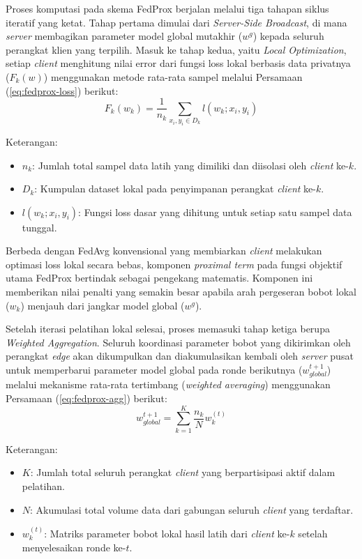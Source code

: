 Proses komputasi pada skema FedProx berjalan melalui tiga tahapan siklus iteratif yang ketat. Tahap pertama dimulai dari \textit{Server-Side Broadcast}, di mana \textit{server} membagikan parameter model global mutakhir ($w^g$) kepada seluruh perangkat klien yang terpilih. Masuk ke tahap kedua, yaitu \textit{Local Optimization}, setiap \textit{client} menghitung nilai error dari fungsi loss lokal berbasis data privatnya ($F_k(w)$) menggunakan metode rata-rata sampel melalui Persamaan (\ref{eq:fedprox-loss}) berikut:
\begin{equation}
  \label{eq:fedprox-loss}
  F_k(w_k) = \frac{1}{n_k} \sum_{x_i, y_i \in D_k} l(w_k; x_i, y_i)
\end{equation}

Keterangan:
\begin{itemize}[itemsep=1pt]
  \item $n_k$: Jumlah total sampel data latih yang dimiliki dan diisolasi oleh \textit{client} ke-$k$.
  \item $D_k$: Kumpulan dataset lokal pada penyimpanan perangkat \textit{client} ke-$k$.
  \item $l(w_k; x_i, y_i)$: Fungsi loss dasar yang dihitung untuk setiap satu sampel data tunggal.
\end{itemize}

Berbeda dengan FedAvg konvensional yang membiarkan \textit{client} melakukan optimasi loss lokal secara bebas, komponen \textit{proximal term} pada fungsi objektif utama FedProx bertindak sebagai pengekang matematis. Komponen ini memberikan nilai penalti yang semakin besar apabila arah pergeseran bobot lokal ($w_k$) menjauh dari jangkar model global ($w^g$).

Setelah iterasi pelatihan lokal selesai, proses memasuki tahap ketiga berupa \textit{Weighted Aggregation}. Seluruh koordinasi parameter bobot yang dikirimkan oleh perangkat \textit{edge} akan dikumpulkan dan diakumulasikan kembali oleh \textit{server} pusat untuk memperbarui parameter model global pada ronde berikutnya ($w^{t+1}_{global}$) melalui mekanisme rata-rata tertimbang (\textit{weighted averaging}) menggunakan Persamaan (\ref{eq:fedprox-agg}) berikut:
\begin{equation}
  \label{eq:fedprox-agg}
  w^{t+1}_{global} = \sum_{k=1}^{K} \frac{n_k}{N} w_k^{(t)}
\end{equation}

Keterangan:
\begin{itemize}[itemsep=1pt]
  \item $K$: Jumlah total seluruh perangkat \textit{client} yang berpartisipasi aktif dalam pelatihan.
  \item $N$: Akumulasi total volume data dari gabungan seluruh \textit{client} yang terdaftar.
  \item $w_k^{(t)}$: Matriks parameter bobot lokal hasil latih dari \textit{client} ke-$k$ setelah menyelesaikan ronde ke-$t$.
\end{itemize}

